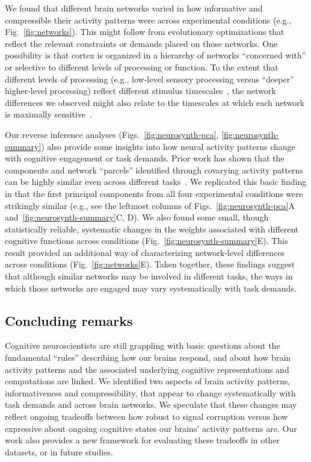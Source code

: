 \documentclass[english, 11pt]{article}
\begin{document}
We found that different brain networks varied in how informative and
compressible their activity patterns were across experimental conditions (e.g.,
Fig.~\ref{fig:networks}). This might
follow from evolutionary optimizations that reflect the relevant constraints or
demands placed on those networks. One possibility is that cortex is organized
in a hierarchy of networks ``concerned with'' or selective to different levels
of processing or function. To the extent that different levels of processing
(e.g., low-level sensory processing versus ``deeper'' higher-level processing)
reflect different stimulus timescales~\citep[e.g.,][]{Mann20}, the network
differences we observed might also relate to the timescales at which each
network is maximally sensitive~\citep{RegeEtal18, BaldEtal17,LernEtal11,
HassEtal08}.

Our reverse inference analyses (Figs.~\ref{fig:neurosynth-pca},
\ref{fig:neurosynth-summary}) also provide some insights into how neural
activity patterns change with cognitive engagement or task demands. Prior work
has shown that the components and network ``parcels'' identified through
covarying activity patterns can be highly similar even across different
tasks~\citep[including ``rest,'' e.g.,][]{SmitEtal09, LairEtal11}. We
replicated this basic finding in that the first principal components from all
four experimental conditions were strikingly similar (e.g., see the leftmost
columns of Figs.~\ref{fig:neurosynth-pca}A and~\ref{fig:neurosynth-summary}C,
D). We also found some small, though statistically reliable, systematic changes
in the weights associated with different cognitive functions across conditions
(Fig.~\ref{fig:neurosynth-summary}E). This result provided an additional way of
characterizing network-level differences across conditions
(Fig.~\ref{fig:networks}E).  Taken together, these findings suggest that although
similar networks may be involved in different tasks, the ways in which those
networks are engaged may vary systematically with task demands.



\subsection*{Concluding remarks}

Cognitive neuroscientists are still grappling with basic questions about the
fundamental ``rules'' describing how our brains respond, and about how brain
activity patterns and the associated underlying cognitive representations and
computations are linked. We identified two aspects of brain activity patterns,
informativeness and compressibility, that appear to change systematically with
task demands and across brain networks. We speculate that these changes may
reflect ongoing tradeoffs between how robust to signal corruption versus how
expressive about ongoing cognitive states our brains' activity patterns are.
Our work also provides a new framework for evaluating these tradeoffs in other
datasets, or in future studies.
\end{document}
